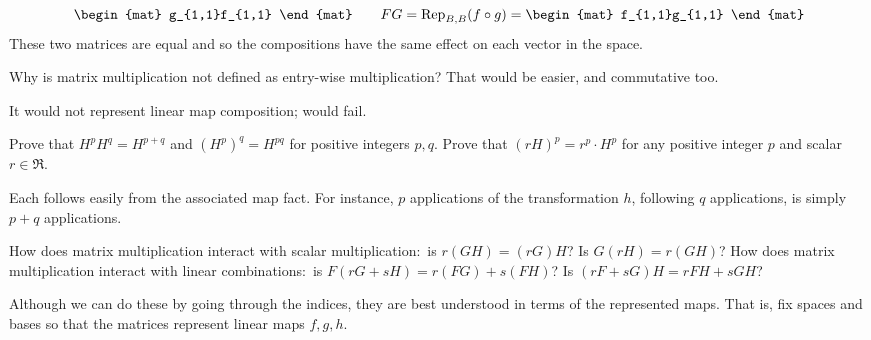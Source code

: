 \begin{exercises}
\begin{answer}
\begin{equation*}
\begin{mat}
                        g_{1,1}f_{1,1}
                     \end{mat}
        \qquad
        FG=\rep{\composed{f}{g}}{B,B}=\begin{mat}
                        f_{1,1}g_{1,1}
                     \end{mat}
      \end{equation*}
      These two matrices are equal and so the compositions have the same
      effect on each vector in the space.
     \end{answer}
  \item  
    Why is matrix multiplication not defined as entry-wise multiplication?
    That would be easier, and commutative too.
    \begin{answer}
      It would not represent linear map composition; 
       would fail.  
    \end{answer}
  \recommended \item \label{exer:NicePropsMatMult} 
    \begin{exparts}
      \partsitem Prove that $H^pH^q=H^{p+q}$ and $(H^p)^q=H^{pq}$ 
        for positive integers \( p,q \).
      \partsitem Prove that $(rH)^p=r^p\cdot H^p$ 
        for any positive integer \( p \) and scalar \( r\in\Re \).
    \end{exparts}
    \begin{answer}
      Each follows easily from the associated map fact.
      For instance, $p$ applications of the transformation $h$, following $q$
      applications, is simply $p+q$ applications.
    \end{answer}
  \recommended \item \label{exer:MoreNicePropsMatMult} 
    \begin{exparts}
      \partsitem How does matrix multiplication interact with 
        scalar multiplication:~is \( r(GH)=(rG)H \)?
        Is \( G(rH)=r(GH) \)?
      \partsitem  How does matrix multiplication interact with 
        linear combinations:~is \( F(rG+sH)=r(FG)+s(FH) \)?
        Is $(rF+sG)H=rFH+sGH$?
    \end{exparts}
    \begin{answer}  
      Although we can do these by going through the indices, they
      are best understood in terms of the represented maps.
      That is, fix spaces and bases so that the matrices 
      represent linear maps $f,g,h$.
\end{answer}
\end{exercises}

